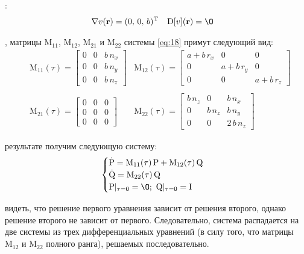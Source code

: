 \documentclass[12pt, cleqn, a4paper]{article}
\newcommand{\bfv}[1]{\mathbf{#1}}
\newcommand{\dd}[1]{\dot{#1}}
\newcommand{\dv}[1]{\nabla v(#1)}
\newcommand{\ddv}[1]{\mathrm{D}[v](#1)}
\newcommand{\T}[1]{#1^\mathrm{T}}
\newcommand{\matr}[1]{\mathrm{#1}}
\begin{document}
:
\begin{align*}
\dv{\bfv{r}} &= \T{(0,\,0,\,b)}  &   \ddv{\bfv{r}} &= \matr{\O}
\end{align*}

, матрицы $\matr{M}_{11}$, $\matr{M}_{12}$, $\matr{M}_{21}$ и $\matr{M}_{22}$ системы \eqref{eq:18} примут следующий вид:
\begin{align*} 
&\matr{M}_{11}(\tau) = \begin{bmatrix}
0 & 0 & b\,n_x\\
0 & 0 & b\,n_y\\
0 & 0 & b\,n_z
\end{bmatrix}&\matr{M}_{12}(\tau) = \begin{bmatrix}
a + b\,r_x & 0 & 0\\
0 & a + b\,r_y & 0\\
0 & 0 & a + b\,r_z
\end{bmatrix}\\\\
&\matr{M}_{21}(\tau) = \begin{bmatrix}
0 & 0 & 0\\
0 & 0 & 0\\
0 & 0 & 0
\end{bmatrix}&\matr{M}_{22}(\tau) = \begin{bmatrix}
b\,n_z & 0 & b\,n_x\\
0 & b\,n_z & b\,n_y\\
0 & 0 & 2\,b\,n_z
\end{bmatrix}
\end{align*}

 результате получим следующую систему:
\begin{equation} \label{eq:43}
\begin{cases}
\dd{\matr{P}} = \matr{M}_{11}(\tau)\,\matr{P} + \matr{M}_{12}(\tau)\,\matr{Q}\\
\dd{\matr{Q}} = \matr{M}_{22}(\tau)\,\matr{Q}\\
\matr{P}|_{\tau=0} = \matr{\O}; \ \matr{Q}|_{\tau=0} = \matr{I}
\end{cases}
\end{equation}

 видеть, что решение первого уравнения зависит от решения второго, однако решение второго не зависит от первого. Следовательно, система распадается на две системы из трех дифференциальных уравнений (в силу того, что матрицы $\matr{M}_{12}$ и $\matr{M}_{22}$ полного ранга), решаемых последовательно.
\end{document}
